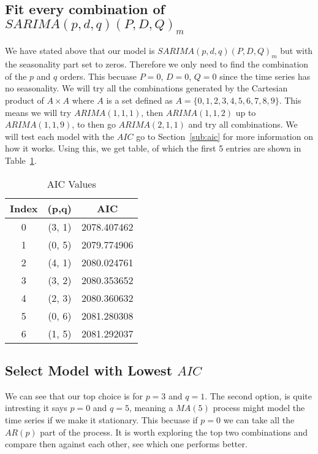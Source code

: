 \documentclass[journal]{IEEEtran}
\begin{document}
\subsection{Fit every combination of $SARIMA(p,d,q)(P,D,Q)_m$}

We have stated above that our model is $SARIMA(p,d,q)(P,D,Q)_m$ but with the
seasonality part set to zeros. Therefore we only need to find the combination
of the $p$ and $q$ orders. This becuase $P=0$, $D=0$, $Q=0$ since the time
series has no seasonality. We will try all the combinations generated by the
Cartesian product of $A\times A$ where $A$ is a set defined as $A =
\{0,1,2,3,4,5,6,7,8,9\}$. This means we will try $ARIMA(1,1,1)$, then
$ARIMA(1,1,2)$ up to $ARIMA(1,1,9)$, to then go $ARIMA(2,1,1)$ and try all
combinations. We will test each model with the $AIC$ go to
Section~\ref{sub:aic} for more information on how it works. Using this, we get
table, of which the first 5 entries are shown in Table~\ref{tab:aic}.

\begin{table}[htbp]
  \centering
  \caption{AIC Values}
  \label{tab:aic}
  \begin{tabular}{|c|c|c|}
    \hline
    Index & (p,q) & AIC \\
    \hline
    0 & (3, 1) & 2078.407462 \\
    1 & (0, 5) & 2079.774906 \\
    2 & (4, 1) & 2080.024761 \\
    3 & (3, 2) & 2080.353652 \\
    4 & (2, 3) & 2080.360632 \\
    5 & (0, 6) & 2081.280308 \\
    6 & (1, 5) & 2081.292037 \\
    \hline
  \end{tabular}
\end{table}

\subsection{Select Model with Lowest $AIC$}

We can see that our top choice is for $p=3$ and $q=1$. The second option, is
quite intresting it says $p=0$ and $q=5$, meaning a $MA(5)$ process might
model the time series if we make it stationary. This becuase if $p=0$ we can
take all the $AR(p)$ part of the process. It is worth exploring the top two
combinations and compare then against each other, see which one performs
better.
\end{document}
